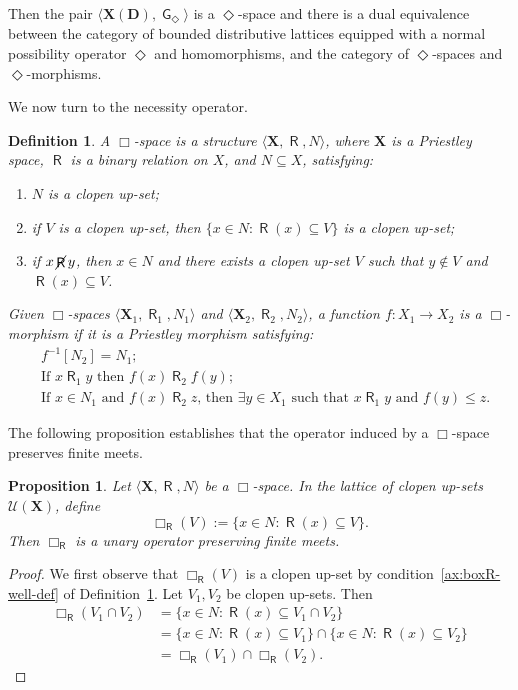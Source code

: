 \documentclass[10pt,a4paper]{amsart}
\newtheorem{proposition}[theorem]{Proposition}
\newtheorem{definition}[theorem]{Definition}
\DeclareMathOperator{\G}{\mathsf{G}}
\DeclareMathOperator{\R}{\mathsf{R}}
\DeclareMathOperator{\notR}{\cancel{ \R}}
\newcommand{\D}{\mathbf{D}}
\newcommand{\X}{\mathbf{X}}
\newcommand{\U}{\mathcal{U}}
\begin{document}
Then the pair $\langle \X(\D),\G_\Diamond\rangle$ is a $\Diamond$-space and there is a dual equivalence between the category of bounded distributive lattices equipped with a normal possibility operator $\Diamond$ and homomorphisms, and the category of $\Diamond$-spaces and $\Diamond$-morphisms.

We now turn to the necessity operator.

\begin{definition}
\label{def:box-space}
A \emph{$\Box$-space} is a structure $\langle \X, \R, N \rangle$, where $\X$ is a Priestley space, $\R$ is a binary relation on $X$, and $N \subseteq X$, satisfying:
\begin{enumerate}
    \item \label{ax:N-clopen} $N$ is a clopen up-set;
    \item \label{ax:boxR-well-def} if $V$ is a clopen up-set, then $\{x \in N : \R(x) \subseteq V\}$ is a clopen up-set;
    \item \label{ax:boxR-epsilon} if $x\notR y$, then $x \in N$ and there exists a clopen up-set $V$ such that $y \notin V$ and $\R(x) \subseteq V$.
\end{enumerate}

Given $\Box$-spaces $\langle \X_1, \R_1, N_1 \rangle$ and $\langle \X_2, \R_2, N_2 \rangle$, a function
$f \colon X_1 \to X_2$ is a \emph{$\Box$-morphism} if it is a Priestley morphism satisfying:
\begin{align}
    &f^{-1}[N_2] = N_1; \tag{BN}\label{ax:box-morph-N}\\
    &\text{If }x\R_1 y \text{ then } f(x)\R_2 f(y); \tag{BR1}\label{ax:box-morph1}\\
    &\text{If }x \in N_1 \text{ and } f(x)\R_2 z \text{, then } \exists y \in X_1 \text{ such that }x\R_1 y\text{ and } f(y) \leq z. \tag{BR2}\label{ax:box-morph2}
\end{align}
\end{definition}

The following proposition establishes that the operator induced by a $\Box$-space preserves finite meets.

\begin{proposition}
\label{prop:box-R-meet-preserving}
Let $\langle \X, \R, N \rangle$ be a $\Box$-space. In the lattice of clopen up-sets $\U(\X)$, define
\[
\Box_{\R}(V) := \{x \in N : \R(x) \subseteq V\}.
\]
Then $\Box_{\R}$ is a unary operator preserving finite meets.
\end{proposition}
\begin{proof}
We first observe that $\Box_{\R}(V)$ is a clopen up-set by condition~\ref{ax:boxR-well-def} of Definition~\ref{def:box-space}. Let $V_1, V_2$ be clopen up-sets. Then
\begin{align*}
\Box_{\R}(V_1 \cap V_2)
&= \{x \in N : \R(x) \subseteq V_1 \cap V_2\} \\
&=\{x \in N : \R(x) \subseteq V_1\} \cap \{x \in N : \R(x) \subseteq V_2\} \\
&= \Box_{\R}(V_1) \cap \Box_{\R}(V_2).
\end{align*}
\end{proof}
\end{document}
